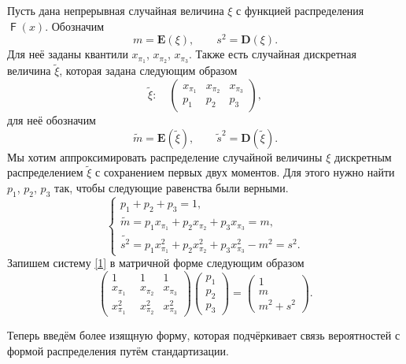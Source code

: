 \documentclass[specialist, substylefile = spbu.rtx,
subf,href,colorlinks=true, 12pt]{disser}
\DeclareMathOperator{\F}{\mathsf{F}}
\begin{document}
Пусть дана непрерывная случайная величина $\xi$ с функцией распределения $\F(x)$. Обозначим \[m = \mathbf E(\xi), \quad\quad s^{2} = \mathbf D(\xi).\]
Для неё заданы квантили $x_{\pi_{1}}$, $x_{\pi_{2}}$, $x_{\pi_{3}}$. Также есть случайная дискретная величина $\tilde{\xi}$, которая задана следующим образом
\[\tilde{\xi}:\quad\begin{pmatrix} 
	x_{\pi_{1}}&x_{\pi_{2}}&x_{\pi_{3}}\\ 
	p_{1} &  p_{2}  & p_{3}
\end{pmatrix},\]
для неё обозначим \[\tilde{m} = \mathbf E(\tilde{\xi}), \quad\quad \tilde{s}^{2} = \mathbf D(\tilde{\xi}).\]
Мы хотим аппроксимировать распределение случайной величины $\xi$ дискретным распределением $\tilde{\xi}$ с сохранением первых двух моментов. Для этого нужно найти $p_{1}$, $p_{2}$, $p_{3}$ так, чтобы следующие равенства были верными.
\begin{equation}
	\begin{cases}
	p_{1} + p_{2} + p_{3} = 1, \\
	\tilde{m} = p_{1}x_{\pi_{1}} + p_{2}x_{\pi_{2}} + p_{3}x_{\pi_{3}} = m,\\
	\tilde{s^{2}} = p_{1} x_{\pi_{1}}^{2} + p_{2} x_{\pi_{2}}^{2} + p_{3} x_{\pi_{3}}^{2} - m^{2} = s^{2}. 
	\end{cases}\label{1}
\end{equation}
Запишем систему \eqref{1} в матричной форме следующим образом
\[\begin{pmatrix} 
	1&1&1\\ 
	x_{\pi_{1}} &  x_{\pi_{2}}  & x_{\pi_{3}} \\ 
	x_{\pi_{1}}^2~~&x_{\pi_{2}}^2  &x_{\pi_{3}}^2
\end{pmatrix}
\begin{pmatrix}p_{1}\\p_{2}\\ p_{3}\end{pmatrix}= \begin{pmatrix}1\\m\\m^{2}+s^{2}\end{pmatrix}.\]

Теперь введём более изящную форму, которая подчёркивает связь вероятностей с формой распределения путём стандартизации.
\end{document}
